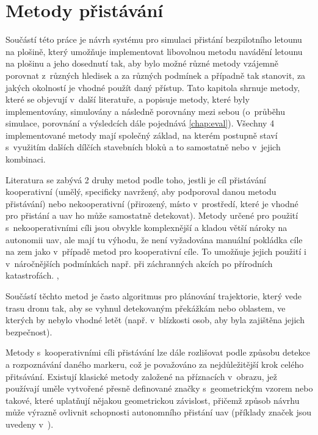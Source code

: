 \chapter{Metody přistávání} \label{chap:algs}
    Součástí této práce je návrh systému pro simulaci přistání bezpilotního letounu na plošině, který umožňuje implementovat libovolnou metodu navádění letounu na plošinu a jeho dosednutí tak, aby bylo možné různé metody vzájemně porovnat z~různých hledisek a za různých podmínek a případně tak stanovit, za jakých okolností je vhodné použít daný přístup. Tato kapitola shrnuje metody, které se objevují v~další literatuře, a popisuje metody, které byly implementovány, simulovány a následně porovnány mezi sebou (o~průběhu simulace, porovnání a výsledcích dále pojednává \cref{chap:eval}). Všechny 4 implementované metody mají společný základ, na kterém postupně staví s~využitím dalších dílčích stavebních bloků a to samostatně nebo v~jejich kombinaci.

    Literatura se zabývá 2 druhy metod podle toho, jestli je cíl přistávání kooperativní (umělý, specificky navržený, aby podporoval danou metodu přistávání) nebo nekooperativní (přirozený, místo v~prostředí, které je vhodné pro přistání a \acrshort{uav} ho může samostatně detekovat). Metody určené pro použití s~nekooperativními cíli jsou obvykle komplexnější a kladou větší nároky na autonomii \acrshort{uav}, ale mají tu výhodu, že není vyžadována manuální pokládka cíle na zem jako v~případě metod pro kooperativní cíle. To umožňuje jejich použití i v~náročnějších podmínkách např. při záchranných akcích po přírodních katastrofách. \cite{Xin2022}, \cite{Kakaletsis2022}

    Součástí těchto metod je často algoritmus pro plánování trajektorie, který vede trasu dronu tak, aby se vyhnul detekovaným překážkám nebo oblastem, ve kterých by nebylo vhodné letět (např. v~blízkosti osob, aby byla zajištěna jejich bezpečnost). \cite{Kakaletsis2022}

    Metody s~kooperativními cíli přistávání lze dále rozlišovat podle způsobu detekce a rozpoznávání daného markeru, což je považováno za nejdůležitější krok celého přitsávání. Existují klasické metody založené na příznacích v~obrazu, jež používají uměle vytvořené přesně definované značky s~geometrickým vzorem nebo takové, které uplatňují nějakou geometrickou závislost, přičemž způsob návrhu může výrazně ovlivnit schopnosti autonomního přistání \acrshort{uav} (příklady značek jsou uvedeny v~). \cite{Xin2022}

